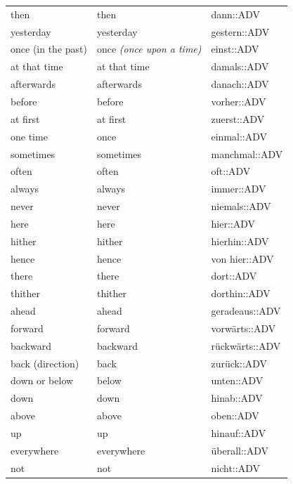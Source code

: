 \begin{center}
\begin{longtable}{lll}
{\sc \lowercase{	THEN	}}	&	then		&	dann::ADV	\\
{\sc \lowercase{	YESTERDAY	}}	&	yesterday		&	gestern::ADV	\\
{\sc \lowercase{	ONCE \footnotesize (IN THE PAST)	}}	&	once	\textit{\footnotesize (once upon a time)}	&	einst::ADV	\\
{\sc \lowercase{	AT THAT TIME	}}	&	at that time		&	damals::ADV	\\
{\sc \lowercase{	AFTERWARDS	}}	&	afterwards		&	danach::ADV	\\
{\sc \lowercase{	BEFORE	}}	&	before		&	vorher::ADV	\\
{\sc \lowercase{	AT FIRST	}}	&	at first		&	zuerst::ADV	\\
{\sc \lowercase{	ONE TIME	}}	&	once		&	einmal::ADV	\\
{\sc \lowercase{	SOMETIMES	}}	&	sometimes		&	manchmal::ADV	\\
{\sc \lowercase{	OFTEN	}}	&	often		&	oft::ADV	\\
{\sc \lowercase{	ALWAYS	}}	&	always		&	immer::ADV	\\
{\sc \lowercase{	NEVER	}}	&	never		&	niemals::ADV	\\
{\sc \lowercase{	HERE	}}	&	here		&	hier::ADV	\\
{\sc \lowercase{	HITHER	}}	&	hither		&	hierhin::ADV	\\
{\sc \lowercase{	HENCE	}}	&	hence		&	von hier::ADV	\\
{\sc \lowercase{	THERE	}}	&	there		&	dort::ADV	\\
{\sc \lowercase{	THITHER	}}	&	thither		&	dorthin::ADV	\\
{\sc \lowercase{	AHEAD	}}	&	ahead		&	geradeaus::ADV	\\
{\sc \lowercase{	FORWARD	}}	&	forward		&	vorwärts::ADV	\\
{\sc \lowercase{	BACKWARD	}}	&	backward		&	rückwärts::ADV	\\
{\sc \lowercase{	BACK \footnotesize (DIRECTION)	}}	&	back		&	zurück::ADV	\\
{\sc \lowercase{	DOWN OR BELOW	}}	&	below		&	unten::ADV	\\
{\sc \lowercase{	DOWN	}}	&	down		&	hinab::ADV	\\
{\sc \lowercase{	ABOVE	}}	&	above		&	oben::ADV	\\
{\sc \lowercase{	UP	}}	&	up		&	hinauf::ADV	\\
{\sc \lowercase{	EVERYWHERE	}}	&	everywhere		&	überall::ADV	\\
{\sc \lowercase{	NOT	}}	&	not		&	nicht::ADV	\\

\end{longtable}
\end{center}
